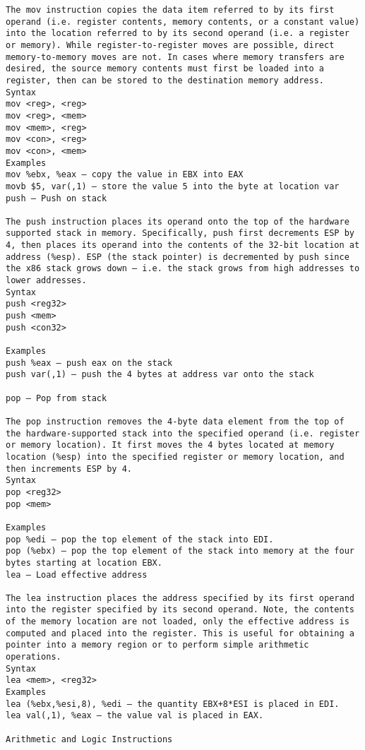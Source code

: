 \documentclass[10pt]{article}
\begin{document}
{\begin{multicols*}{5}
\begin{lstlisting}[breaklines=true,columns=fullflexible]
The mov instruction copies the data item referred to by its first operand (i.e. register contents, memory contents, or a constant value) into the location referred to by its second operand (i.e. a register or memory). While register-to-register moves are possible, direct memory-to-memory moves are not. In cases where memory transfers are desired, the source memory contents must first be loaded into a register, then can be stored to the destination memory address.
Syntax
mov <reg>, <reg>
mov <reg>, <mem>
mov <mem>, <reg>
mov <con>, <reg>
mov <con>, <mem>
Examples
mov %ebx, %eax — copy the value in EBX into EAX
movb $5, var(,1) — store the value 5 into the byte at location var
push — Push on stack

The push instruction places its operand onto the top of the hardware supported stack in memory. Specifically, push first decrements ESP by 4, then places its operand into the contents of the 32-bit location at address (%esp). ESP (the stack pointer) is decremented by push since the x86 stack grows down — i.e. the stack grows from high addresses to lower addresses.
Syntax
push <reg32>
push <mem>
push <con32>

Examples
push %eax — push eax on the stack
push var(,1) — push the 4 bytes at address var onto the stack

pop — Pop from stack

The pop instruction removes the 4-byte data element from the top of the hardware-supported stack into the specified operand (i.e. register or memory location). It first moves the 4 bytes located at memory location (%esp) into the specified register or memory location, and then increments ESP by 4.
Syntax
pop <reg32>
pop <mem>

Examples
pop %edi — pop the top element of the stack into EDI.
pop (%ebx) — pop the top element of the stack into memory at the four bytes starting at location EBX.
lea — Load effective address

The lea instruction places the address specified by its first operand into the register specified by its second operand. Note, the contents of the memory location are not loaded, only the effective address is computed and placed into the register. This is useful for obtaining a pointer into a memory region or to perform simple arithmetic operations.
Syntax
lea <mem>, <reg32>
Examples
lea (%ebx,%esi,8), %edi — the quantity EBX+8*ESI is placed in EDI.
lea val(,1), %eax — the value val is placed in EAX.

Arithmetic and Logic Instructions


\end{lstlisting}
\end{multicols*}}
\end{document}
